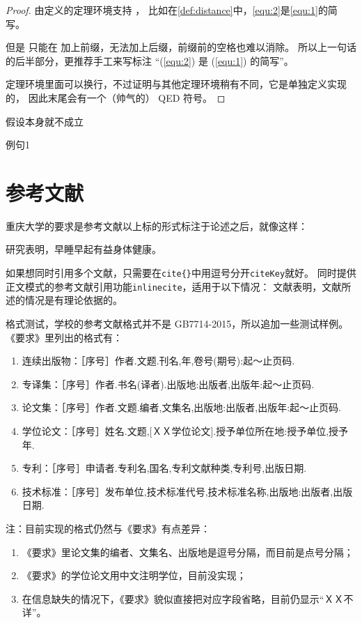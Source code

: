 \begin{proof}
由定义的定理环境支持 ，
比如在\autoref{def:distance}中，\autoref{equ:2}是\autoref{equ:1}的简写。

但是  只能在  加上前缀，无法加上后缀，前缀前的空格也难以消除。
所以上一句话的后半部分，更推荐手工来写标注 “(\ref{equ:2}) 是 (\ref{equ:1}) 的简写”。

定理环境里面可以换行，不过证明与其他定理环境稍有不同，它是单独定义实现的，
因此末尾会有一个（帅气的） QED 符号。
\end{proof}

\begin{assumption}
\label{assume:fail}
假设本身就不成立
\end{assumption}

\begin{lines}
\label{s1}
例句1
\end{lines}

\section{参考文献}
\label{sec:bib}
重庆大学的要求是参考文献以上标的形式标注于论述之后，就像这样：

研究表明\cite{r1}，早睡早起有益身体健康。

如果想同时引用多个文献\cite{r2,r3,r4,r6}，只需要在\verb|cite{}|中用逗号分开\texttt{citeKey}就好。
\cquthesis 同时提供正文模式的参考文献引用功能\texttt{inlinecite}，适用于以下情况：
文献表明，文献所述的情况是有理论依据的。

\nuaathesis 格式测试，学校的参考文献格式并不是 GB7714-2015，所以追加一些测试样例。
《要求》里列出的格式有：
\begin{enumerate}
  \item 连续出版物\cite{n11,n12}：［序号］作者.文题.刊名,年,卷号(期号):起～止页码.
  \item 专译集\cite{n21,n22}：［序号］作者.书名(译者).出版地:出版者,出版年:起～止页码.
  \item 论文集\cite{n31,n32}：［序号］作者.文题.编者,文集名,出版地:出版者,出版年:起～止页码.
  \item 学位论文\cite{n41,n42,n43}：［序号］姓名.文题,[ＸＸ学位论文].授予单位所在地:授予单位,授予年.
  \item 专利\cite{n51,n52,n53}：［序号］申请者.专利名,国名,专利文献种类,专利号,出版日期.
  \item 技术标准\cite{n61,n62,n63}：［序号］发布单位,技术标准代号,技术标准名称,出版地:出版者,出版日期.
\end{enumerate}

注：目前实现的格式仍然与《要求》有点差异：
\begin{enumerate}
  \item 《要求》里论文集的编者、文集名、出版地是逗号分隔，而目前是点号分隔；
  \item 《要求》的学位论文用中文注明学位，目前没实现；
  \item 在信息缺失的情况下，《要求》貌似直接把对应字段省略，目前仍显示“ＸＸ不详”。
\end{enumerate}
